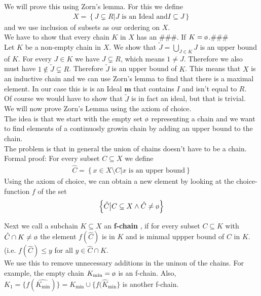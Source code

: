 We will prove this using Zorn's lemma. For this we define 
\begin{align*}
	X = \left\{J \subsetneq R | J \text{ is an Ideal and} I \subseteq J \right\}
\end{align*}
and we use inclusion of subsets as our ordering on $X$.\\
We have to show that every chain $K$ in $X$ has an \#\#\#. If $K = \es$.\#\#\#\\

Let $K$ be a non-empty chain in $X$. We show that $\tilde{J} = \bigcup_{J \in K} J$ is an upper bound of $K$. For every $J \in K$ we have $J \subsetneq R$, which means $1 \neq J$. Therefore we also must have $1 \notin \tilde{J} \subsetneq R$. Therefore $\tilde{J}$ is an upper bound of $K$.
This means that $X$ is an inductive chain and we can use Zorn's lemma to find that there is a maximal element. In our case this is is an Ideal $\bm{m}$ that contains $I$ and isn't equal to $R$.\\

Of course we would have to show that $\tilde{J}$ is in fact an ideal, but that is trivial.\\

We will now prove Zorn's Lemma using the axiom of choice.\\ The idea is that we start with the empty set $\es$ representing a chain and we want to find elements of a continuosly growin chain by adding an upper bound to the chain.\\
The problem is that in general the union of chains doesn't have to be a chain.\\

Formal proof: For every subset $C \subseteq X$ we define
\begin{align*}
	\hat{C} = \left\{x \in X \setminus C \big\vert x \text{ is an upper bound}\right\}
\end{align*}
Using the axiom of choice, we can obtain a new element by looking at the choice-function $f$ of the set
\begin{align*}
	\left\{\hat{C} \big\vert C \subseteq X \land \hat{C} \neq \es\right\}
\end{align*}

Next we call a subchain $K \subseteq X$ an \textbf{f-chain} , if for every subset $C \subseteq K$ with $\hat{C} \cap K \neq \es$ the element $f(\hat{C})$ is in $K$ and is minmal uppper bound of $C$ in $K$. (i.e. $f(\hat{C}) \leq y$ for all $y \in \hat{C} \cap K$.\\
We use this to remove unnecessary additions in the uninon of the chains. For example, the empty chain $K_{\text{min}} = \es$ is an f-chain. Also, $K_1 = \{f(\hat{K_{\text{min}}})\} = K_{\text{min}} \cup \{f(\hat{K}_{\text{min}}\}$ is another f-chain.\\

